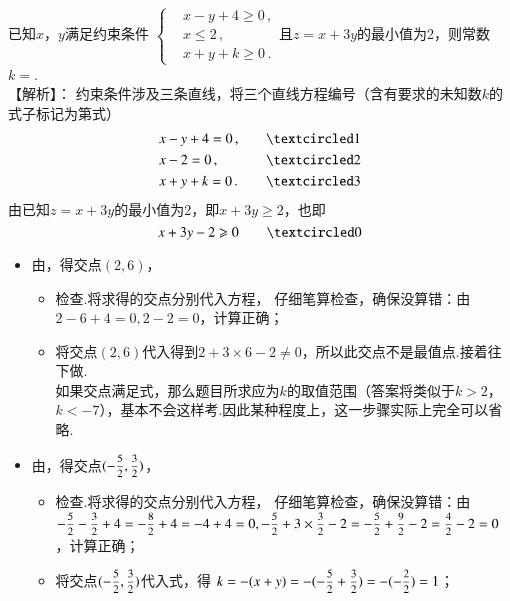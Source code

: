 \begin{exercise}
      已知$x$，$y$满足约束条件
      $\left\{\begin{aligned}
        &x-y+4\geqslant0\,,\\
        &x\leqslant2\,,\\
        &x+y+k\geqslant0\,.
      \end{aligned}\right.$且$z=x+3y$的最小值为2，则常数$k=$\tk.
        \\{\heiti 【解析】：}
          约束条件涉及三条直线，将三个直线方程编号{\kaishu （含有要求的未知数$k$的式子标记为第式）}
          \[\begin{aligned}
            &x-y+4=0\,,\quad &\circled{1}\\
            &x-2=0\,,\quad &\circled{2}\\
            &x+y+k=0\,.\quad &\circled{3}
          \end{aligned}\]
          由已知$z=x+3y$的最小值为2，即$x+3y\geqslant2$，也即
            \[x+3y-2\geqslant0\qquad\circled{0}\]
          \begin{itemize}
            \item 由，得交点$(2,6)$，
              \begin{itemize}
                \item 检查.{\kaishu 将求得的交点分别代入方程，
                  仔细笔算检查，确保没算错：由$2-6+4=0,2-2=0$，计算正确；}
                \item 将交点$(2,6)$代入得到$2+3\times6-2\neq0$，所以此交点不是最值点.接着往下做.\\
                {\kaishu {}如果交点满足式，那么题目所求应为$k$的取值范围（答案将类似于$k>2$，$k<-7$），基本不会这样考.因此某种程度上，这一步骤实际上完全可以省略.}
              \end{itemize}
            \item 由，得交点$(-\mfrac52,\mfrac32)$，
              \begin{itemize}
                \item 检查.{\kaishu 将求得的交点分别代入方程，
                  仔细笔算检查，确保没算错：由$-\mfrac52-\mfrac32+4=-\mfrac82+4=-4+4=0,-\mfrac52+3\times\mfrac32-2=-\mfrac52+\mfrac92-2=\mfrac42-2=0$，计算正确；}
                \item 将交点$(-\mfrac52,\mfrac32)$代入式，得
                  $k=-(x+y)=-(-\mfrac52+\mfrac32)=-(-\mfrac22)=1$；\\

\end{itemize}
\end{itemize}
\end{exercise}
